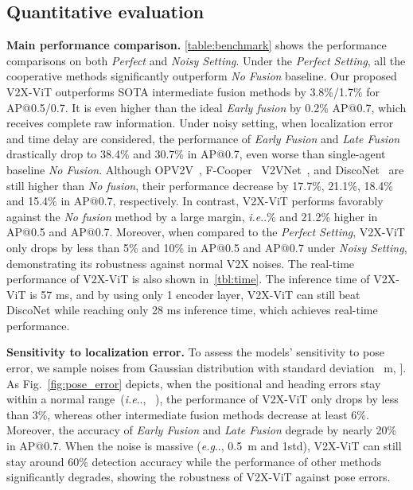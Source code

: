 \documentclass[runningheads]{llncs}
\makeatletter
\DeclareRobustCommand\onedot{\futurelet\@let@token\@onedot}
\def\@onedot{\ifx\@let@token.\else.\null\fi\xspace}
\def\eg{\emph{e.g}\onedot} \def\Eg{\emph{E.g}\onedot}
\def\ie{\emph{i.e}\onedot} \def\Ie{\emph{I.e}\onedot}
\makeatother
\begin{document}
\subsection{Quantitative evaluation}
\noindent\textbf{Main performance comparison.}
\cref{table:benchmark} shows the performance comparisons on both \textit{Perfect} and \textit{Noisy Setting}. 
Under the \textit{Perfect Setting}, all the cooperative methods significantly outperform \textit{No Fusion} baseline. Our proposed V2X-ViT outperforms SOTA intermediate fusion methods by 3.8\%/1.7\% for AP@0.5/0.7. It
is even higher than the ideal \textit{Early fusion} by 0.2\% AP@0.7, which receives complete raw information. Under noisy setting, when localization error and time delay are considered, the performance of \textit{Early Fusion} and \textit{Late Fusion} drastically drop to 38.4\% and 30.7\% in AP@0.7, even worse than single-agent baseline \textit{No Fusion}. Although OPV2V~\cite{xu2021opv2v}, F-Cooper~\cite{chen2019f} V2VNet~\cite{wang2020v2vnet}, and DiscoNet~\cite{li2021learning} are still higher than \textit{No fusion}, their performance decrease by 17.7\%, 21.1\%, 18.4\% and 15.4\% in AP@0.7, respectively. In contrast, V2X-ViT performs favorably against the \textit{No fusion} method by a large margin, \ie 23\% and 21.2\% higher in AP@0.5 and AP@0.7. Moreover, when compared to the \textit{Perfect Setting}, V2X-ViT only drops by less than 5\% and 10\% in AP@0.5 and AP@0.7 under \textit{Noisy Setting}, demonstrating its robustness against normal V2X noises. The real-time performance of V2X-ViT is also shown in~\cref{tbl:time}. The inference time of V2X-ViT is 57 ms, and by using only 1 encoder layer, V2X-ViT can still beat DiscoNet while reaching only 28 ms inference time, which achieves real-time performance.

\noindent\textbf{Sensitivity to localization error.}
To assess the models' sensitivity to pose error, we sample noises from Gaussian distribution with standard deviation ~m, ].
As Fig.~\ref{fig:pose_error} depicts, when the positional and heading errors stay within a normal range~(\ie, ~\cite{RT3000,li2020toward,xia2021advancing}), the performance of V2X-ViT only drops by less than 3\%, whereas other intermediate fusion methods decrease at least 6\%. Moreover, the accuracy of \textit{Early Fusion} and \textit{Late Fusion} degrade by nearly 20\% in AP@0.7. When the noise is massive (\eg, 0.5~m and 1\degree std), V2X-ViT can still stay around 60\% detection accuracy while the performance of other methods significantly degrades, showing the robustness of V2X-ViT against pose errors.
\end{document}
